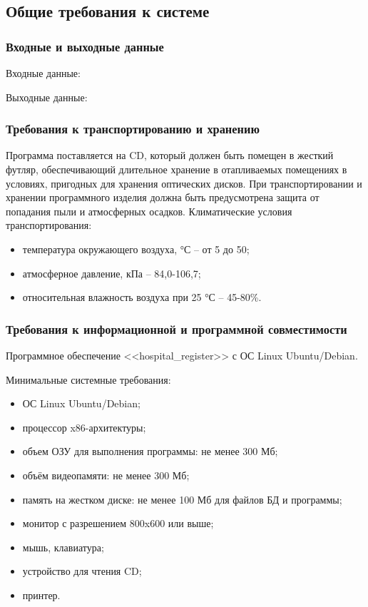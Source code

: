\subsection{Общие требования к системе}
\subsubsection{Входные и выходные данные}

Входные данные:



Выходные данные:



\clearpage
\subsubsection{Требования к транспортированию и хранению}

Программа поставляется на CD, который должен быть помещен в жесткий футляр, обеспечивающий длительное хранение в отапливаемых помещениях в условиях, пригодных для хранения оптических дисков.
При транспортировании и хранении программного изделия должна быть предусмотрена защита от попадания пыли и атмосферных осадков. Климатические условия транспортирования:

\begin{itemize}
  \item температура окружающего воздуха, °С – от 5 до 50;
  \item атмосферное давление, кПа – 84,0-106,7;
  \item относительная влажность воздуха при 25 °С – 45-80\%.
\end{itemize}

\subsubsection{Требования к информационной и программной совместимости}

Программное обеспечение <<hospital\_register>> с ОС Linux Ubuntu/Debian.

Минимальные системные требования:

\begin{itemize}
  \item ОС Linux Ubuntu/Debian;
  \item процессор x86-архитектуры;
  \item объем ОЗУ для выполнения программы: не менее 300 Мб;
  \item объём видеопамяти: не менее 300 Мб;
  \item память на жестком диске: не менее 100 Мб для файлов БД и программы;
  \item монитор с разрешением 800x600 или выше;
  \item мышь, клавиатура;
  \item устройство для чтения CD;
  \item принтер.
\end{itemize}

